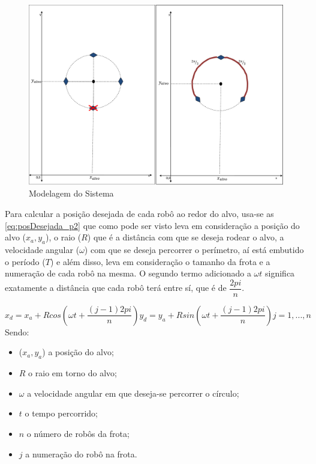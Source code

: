 \begin{figure}[!htb]
	\centering
	\includegraphics[width=1.0\textwidth]{./04-figuras/sistema}
	\caption{Modelagem do Sistema}
	\label{fig:sistema}
\end{figure}

Para calcular a posição desejada de cada robô ao redor do alvo, usa-se as \autoref{eq:posDesejada_p2} que como pode ser visto leva em consideração a posição do alvo ($x_{a},y_{a}$), o raio ($R$) que é a distância com que se deseja rodear o alvo, a velocidade angular ($\omega$) com que se deseja percorrer o perímetro, aí está embutido o período ($T$) e além disso, leva em consideração o tamanho da frota e a numeração de cada robô na mesma. O segundo termo adicionado a $\omega t$ significa exatamente a distância que cada robô terá entre sí, que é de $\dfrac{2pi}{n}$.

\begin{subequations}
\begin{equation}
x_{d} = x_{a} + R cos(\omega t + \dfrac{(j-1)2pi}{n})
\label{eq:xd_p2}
\end{equation}
\begin{equation}
y_{d} = y_{a} + R sin(\omega t + \dfrac{(j-1)2pi}{n})
\label{eq:yd_p2}
\end{equation}
\begin{equation}
j = {1,...,n}
\end{equation}
\label{eq:posDesejada_p2}
\end{subequations}
Sendo:
\begin{itemize}
	\item ($x_{a},y_{a}$) a posição do alvo;
	\item $R$ o raio em torno do alvo;
	\item $\omega$ a velocidade angular em que deseja-se percorrer o círculo;
	\item $t$ o tempo percorrido;
	\item $n$ o número de robôs da frota;
	\item $j$ a numeração do robô na frota. 
\end{itemize}

